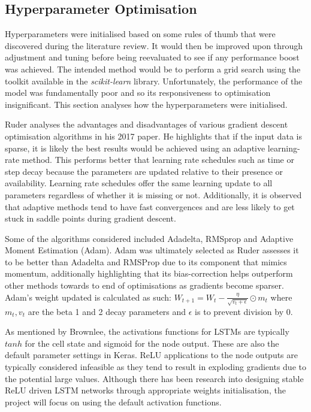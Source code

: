 \documentclass[10pt,onecolumn,letterpaper]{article}
\begin{document}
\subsection{Hyperparameter Optimisation} \label{hyperparameters}

Hyperparameters were initialised based on some rules of thumb that were discovered during the literature review. It would then be improved upon through adjustment and tuning before being reevaluated to see if any performance boost was achieved. The intended method would be to perform a grid search using the toolkit available in the \textit{scikit-learn} library. Unfortunately, the performance of the model was fundamentally poor and so its responsiveness to optimisation insignificant. This section analyses how the hyperparameters were initialised. 

Ruder analyses the advantages and disadvantages of various gradient descent optimisation algorithms in his 2017 paper\cite{Ruder}. He highlights that if the input data is sparse, it is likely the best results would be achieved using an adaptive learning-rate method. This performs better that learning rate schedules such as time or step decay because the parameters are updated relative to their presence or availability. Learning rate schedules offer the same learning update to all parameters regardless of whether it is missing or not. Additionally, it is observed that adaptive methods tend to have fast convergences and are less likely to get stuck in saddle points during gradient descent. 

Some of the algorithms considered included Adadelta, RMSprop and Adaptive Moment Estimation (Adam). Adam\cite{Adam} was ultimately selected as Ruder assesses it to be better than Adadelta and RMSProp due to its component that mimics momentum, additionally highlighting that its bias-correction helps outperform other methods towards to end of optimisations as gradients become sparser. Adam's weight updated is calculated as such: $W_{t+1}=W_{t}-\frac{\eta}{\sqrt{v_{t}+\epsilon}}\odot m_{t}$ where $m_{t}, v_{t}$ are the beta 1 and 2 decay parameters and $\epsilon$ is to prevent division by 0.

As mentioned by Brownlee\cite{brownlee_activation}, the activations functions for LSTMs are typically $tanh$ for the cell state and sigmoid for the node output. These are also the default parameter settings in Keras. ReLU applications to the node outputs are typically considered infeasible as they tend to result in exploding gradients due to the potential large values. Although there has been research into designing stable ReLU driven LSTM networks through appropriate weights initialisation, the project will focus on using the default activation functions.    
\end{document}
